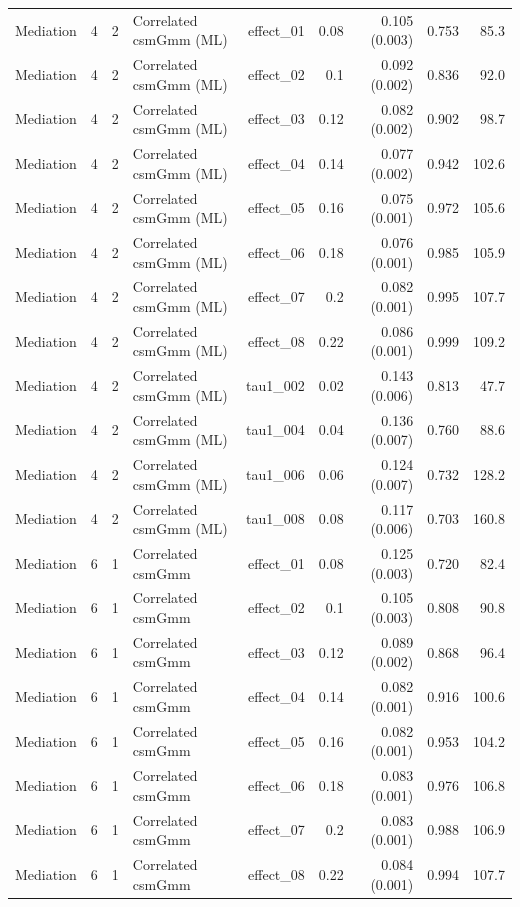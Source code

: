 \begin{longtable}{lcclrrrrr}
Mediation & 4 & 2 & Correlated csmGmm (ML) & effect\_01 & 0.08 & 0.105 (0.003) & 0.753 & 85.3\\
Mediation & 4 & 2 & Correlated csmGmm (ML) & effect\_02 & 0.1 & 0.092 (0.002) & 0.836 & 92.0\\
Mediation & 4 & 2 & Correlated csmGmm (ML) & effect\_03 & 0.12 & 0.082 (0.002) & 0.902 & 98.7\\
Mediation & 4 & 2 & Correlated csmGmm (ML) & effect\_04 & 0.14 & 0.077 (0.002) & 0.942 & 102.6\\
Mediation & 4 & 2 & Correlated csmGmm (ML) & effect\_05 & 0.16 & 0.075 (0.001) & 0.972 & 105.6\\
Mediation & 4 & 2 & Correlated csmGmm (ML) & effect\_06 & 0.18 & 0.076 (0.001) & 0.985 & 105.9\\
Mediation & 4 & 2 & Correlated csmGmm (ML) & effect\_07 & 0.2 & 0.082 (0.001) & 0.995 & 107.7\\
Mediation & 4 & 2 & Correlated csmGmm (ML) & effect\_08 & 0.22 & 0.086 (0.001) & 0.999 & 109.2\\
Mediation & 4 & 2 & Correlated csmGmm (ML) & tau1\_002 & 0.02 & 0.143 (0.006) & 0.813 & 47.7\\
Mediation & 4 & 2 & Correlated csmGmm (ML) & tau1\_004 & 0.04 & 0.136 (0.007) & 0.760 & 88.6\\
Mediation & 4 & 2 & Correlated csmGmm (ML) & tau1\_006 & 0.06 & 0.124 (0.007) & 0.732 & 128.2\\
Mediation & 4 & 2 & Correlated csmGmm (ML) & tau1\_008 & 0.08 & 0.117 (0.006) & 0.703 & 160.8\\
Mediation & 6 & 1 & Correlated csmGmm & effect\_01 & 0.08 & 0.125 (0.003) & 0.720 & 82.4\\
Mediation & 6 & 1 & Correlated csmGmm & effect\_02 & 0.1 & 0.105 (0.003) & 0.808 & 90.8\\
Mediation & 6 & 1 & Correlated csmGmm & effect\_03 & 0.12 & 0.089 (0.002) & 0.868 & 96.4\\
Mediation & 6 & 1 & Correlated csmGmm & effect\_04 & 0.14 & 0.082 (0.001) & 0.916 & 100.6\\
Mediation & 6 & 1 & Correlated csmGmm & effect\_05 & 0.16 & 0.082 (0.001) & 0.953 & 104.2\\
Mediation & 6 & 1 & Correlated csmGmm & effect\_06 & 0.18 & 0.083 (0.001) & 0.976 & 106.8\\
Mediation & 6 & 1 & Correlated csmGmm & effect\_07 & 0.2 & 0.083 (0.001) & 0.988 & 106.9\\
Mediation & 6 & 1 & Correlated csmGmm & effect\_08 & 0.22 & 0.084 (0.001) & 0.994 & 107.7\\

\end{longtable}
